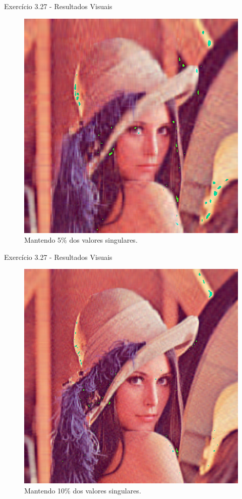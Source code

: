 \documentclass{beamer}
\begin{document}
\begin{frame}{Exerc\'icio 3.27 - Resultados Visuais}
  \begin{figure}
    \centering
    \includegraphics[width=0.65\columnwidth]{Lenna_25.png}
    \caption{Mantendo 5\% dos valores singulares.}
  \end{figure}
\end{frame}

\begin{frame}{Exerc\'icio 3.27 - Resultados Visuais}
  \begin{figure}
    \centering
    \includegraphics[width=0.65\columnwidth]{Lenna_51.png}
    \caption{Mantendo 10\% dos valores singulares.}
  \end{figure}
\end{frame}
\end{document}
